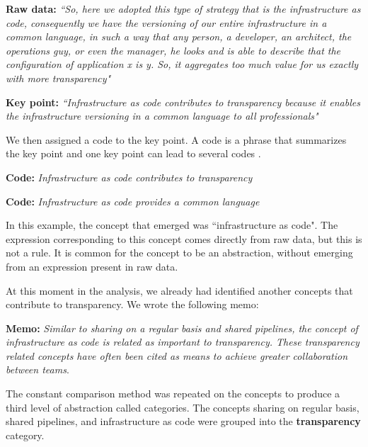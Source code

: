 \textbf{Raw data:} \textit{``So, here we adopted this type of strategy that is
the infrastructure as code, consequently we have the versioning of our entire
infrastructure in a common language, in such a way that any person, a
developer, an architect, the operations guy, or even the manager, he looks and
is able to describe that the configuration of application x is y. So, it
aggregates too much value for us exactly with more transparency"}

\textbf{Key point:} \textit{``Infrastructure as code contributes to
transparency because it enables the infrastructure versioning in a common
language to all professionals"}

We then assigned a code to the key point. A code is a phrase that summarizes
the key point and one key point can lead to several codes \cite{hoda2017becoming}.

\textbf{Code:} \textit{Infrastructure as code contributes to transparency}

\textbf{Code:} \textit{Infrastructure as code provides a common language}

In this example, the concept that emerged was ``infrastructure as code". The
expression corresponding to this concept comes directly from raw data, but this
is not a rule. It is common for the concept to be an abstraction, without
emerging from an expression present in raw data.

At this moment in the analysis, we already had identified another concepts that
contribute to transparency. We wrote the following memo:

\textbf{Memo:} \textit{Similar to sharing on a regular basis and shared
pipelines, the concept of infrastructure as code is related as important to
transparency. These transparency related concepts have often been cited as
means to achieve greater collaboration between teams}.

The constant comparison method was repeated on the concepts to produce a third
level of abstraction called categories. The concepts sharing on regular basis,
shared pipelines, and infrastructure as code were grouped into
the \textbf{transparency} category.

